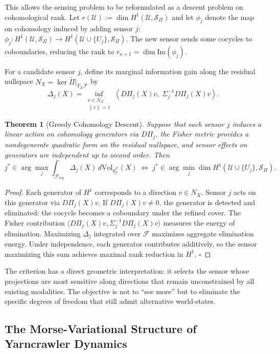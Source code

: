 \documentclass[12pt, oneside]{article}
\newtheorem{theorem}{Theorem}[section]
\newcommand{\Ftil}{\widetilde{\Pi}}
\begin{document}
This allows the sensing problem to be reformulated as a descent problem on cohomological
rank. Let $r(\mathcal{U}) := \dim H^1(\mathcal{U}, \mathcal{S}_\Pi)$ and let $\phi_j$
denote the map on cohomology induced by adding sensor $j$:
$\phi_j : H^1(\mathcal{U}, \mathcal{S}_\Pi) \to H^1(\mathcal{U} \cup \{U_j\}, \mathcal{S}_\Pi)$.
The new sensor sends some cocycles to coboundaries, reducing the rank to
$r_{n+1} = \dim \mathrm{Im}(\phi_j)$.

For a candidate sensor $j$, define its marginal information gain along the residual
nullspace $N_X = \ker \Ftil|_{T_X\mathcal{F}}$ by
\[
\Delta_j(X) = \inf_{\substack{v \in N_X \\ \|v\|=1}}
\left\langle D\Pi_j(X)v,\; \Sigma_j^{-1} D\Pi_j(X)v \right\rangle.
\]

\begin{theorem}[Greedy Cohomology Descent]
\label{thm:greedy_descent}
Suppose that each sensor $j$ induces a linear action on cohomology generators via
$D\Pi_j$, the Fisher metric provides a nondegenerate quadratic form on the residual
nullspace, and sensor effects on generators are independent up to second order. Then
\[
j^* \in \arg\max_j \int_{\mathcal{F}_{\mathrm{reg}}} \Delta_j(X)\,
d\mathrm{Vol}_{g_F^{\mathcal{F}}}(X)
\;\Longleftrightarrow\;
j^* \in \arg\min_j \dim H^1(\mathcal{U} \cup \{U_j\}, \mathcal{S}_\Pi).
\]
\end{theorem}

\begin{proof}
Each generator of $H^1$ corresponds to a direction $v \in N_X$. Sensor $j$ acts on this
generator via $D\Pi_j(X)v$. If $D\Pi_j(X)v \ne 0$, the generator is detected and
eliminated: the cocycle becomes a coboundary under the refined cover. The Fisher
contribution $\langle D\Pi_j(X)v, \Sigma_j^{-1} D\Pi_j(X)v\rangle$ measures the energy
of elimination. Maximizing $\Delta_j$ integrated over $\mathcal{F}$ maximizes aggregate
elimination energy. Under independence, each generator contributes additively, so the
sensor maximizing this sum achieves maximal rank reduction in $H^1$. $\square$
\end{proof}

The criterion has a direct geometric interpretation: it selects the sensor whose
projections are most sensitive along directions that remain unconstrained by all existing
modalities. The objective is not to ``see more'' but to eliminate the specific degrees of
freedom that still admit alternative world-states.

\subsection{The Morse-Variational Structure of Yarncrawler Dynamics}
\end{document}
